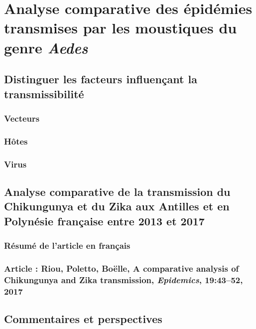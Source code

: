\chapter{Analyse comparative des épidémies transmises par les moustiques du genre \textit{Aedes}} 

\section{Distinguer les facteurs influençant la transmissibilité}

\subsection{Vecteurs}

\subsection{Hôtes}

\subsection{Virus}

\section{Analyse comparative de la transmission du Chikungunya et du Zika aux Antilles et en Polynésie française entre 2013 et 2017}

\subsection{Résumé de l'article en français}

\subsection{Article : Riou, Poletto, Boëlle, A comparative analysis of Chikungunya and Zika transmission, {\em Epidemics}, 19:43--52, 2017}

%

\section{Commentaires et perspectives}

